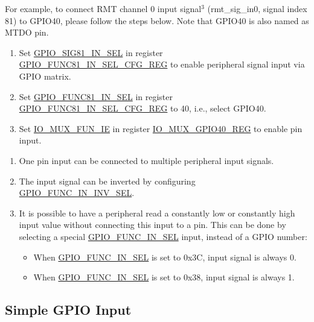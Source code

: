 \documentclass[main\_\_EN.tex]{subfiles}
\begin{document}
For example, to connect RMT channel 0 input signal\hyperref[input-note-3]{$^3$} (rmt\_sig\_in0, signal index 81) to GPIO40, please follow the steps below. Note that GPIO40 is also named as MTDO pin.

\begin{enumerate}
\item Set \hyperref[fielddesc:GPIOSIGNINSEL]{GPIO\_SIG81\_IN\_SEL} in register \hyperref[regdesc:GPIOFUNCNINSELCFGREG]{GPIO\_FUNC81\_IN\_SEL\_CFG\_REG} to enable peripheral signal input via GPIO matrix.
\item Set \hyperref[fielddesc:GPIOFUNCNINSEL]{GPIO\_FUNC81\_IN\_SEL} in register \hyperref[regdesc:GPIOFUNCNINSELCFGREG]{GPIO\_FUNC81\_IN\_SEL\_CFG\_REG} to 40, i.e., select GPIO40.
\item Set \hyperref[fielddesc:IOMUXFUNIE]{IO\_MUX\_FUN\_IE} in register \hyperref[regdesc:IOMUXnREG]{IO\_MUX\_GPIO40\_REG} to enable pin input.
\end{enumerate}

\begin{tiplisting}
\vspace{-2em}
\begin{enumerate}
\item \label{input-note-1}  One pin input can be connected to multiple peripheral input signals.
\item \label{input-note-2} The input signal can be inverted by configuring \hyperref[fielddesc:GPIOFUNCNININVSEL]{GPIO\_FUNC\_IN\_INV\_SEL}.
\item \label{input-note-3} It is possible to have a peripheral read a constantly low or constantly high input value without connecting this input to a pin. This can be done by selecting a special \hyperref[fielddesc:GPIOFUNCNINSEL]{GPIO\_FUNC\_IN\_SEL} input, instead of a GPIO number:
\begin {itemize}
\item When \hyperref[fielddesc:GPIOFUNCNINSEL]{GPIO\_FUNC\_IN\_SEL} is set to 0x{}3C, input signal is always 0.
\item When \hyperref[fielddesc:GPIOFUNCNINSEL]{GPIO\_FUNC\_IN\_SEL} is set to 0x{}38, input signal is always 1.
\end{itemize}
\end{enumerate}
\end{tiplisting}

\subsection{Simple GPIO Input}\label{IOMUXSimpleGPIOInput}
\end{document}
